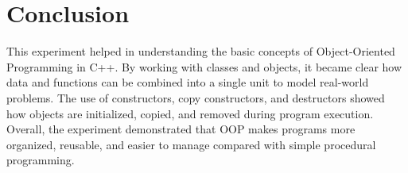 \section{Conclusion}

This experiment helped in understanding the basic concepts of Object-Oriented Programming in C++. By working with classes and objects, it became clear how data and functions can be combined into a single unit to model real-world problems. The use of constructors, copy constructors, and destructors showed how objects are initialized, copied, and removed during program execution. Overall, the experiment demonstrated that OOP makes programs more organized, reusable, and easier to manage compared with simple procedural programming.
